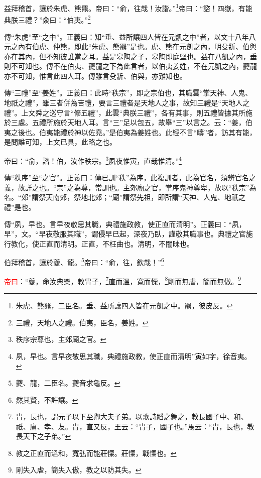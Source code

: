 益拜稽首，讓於朱虎、熊羆。帝曰：“俞，往哉！汝諧。”\footnote{朱虎、熊羆，二臣名。垂、益所讓四人皆在元凱之中。羆，彼皮反。}帝曰：“諮！四嶽，有能典朕三禮？”僉曰：“伯夷。”\footnote{三禮，天地人之禮。伯夷，臣名，姜姓。}

{\noindent\zhuan{}\fzbyks 傳“朱虎”至“之中”。正義曰：知“垂、益所讓四人皆在元凱之中”者，以文十八年八元之內有伯虎、仲熊，即此“朱虎、熊羆”是也。虎、熊在元凱之內，明殳斨、伯與亦在其內，但不知彼誰當之耳。益是皋陶之子，皋陶即庭堅也。益在八凱之內，垂則不可知也。傳不在伯夷、夔龍之下為此言者，以伯夷姜姓，不在元凱之內，夔龍亦不可知，惟言此四人耳。傳雖言殳斨、伯與，亦難知也。 \par}

{\noindent\zhuan{}\fzbyks 傳“三禮”至“姜姓”。正義曰：此時“秩宗”，即之宗伯也，其職雲“掌天神、人鬼、地祇之禮”，雖三者併為吉禮，要言三禮者是天地人之事，故知三禮是“天地人之禮”。上文舜之巡守言“修五禮”，此雲“典朕三禮”，各有其事，則五禮皆據其所施於三處。五禮所施於天地人耳。言“三”足以包五，故舉“三”以言之。云：“姜，伯夷之後也。伯夷能禮於神以佐堯。”是伯夷為姜姓也。此經不言“疇”者，訪其有能，是問誰可知，上文已具，此略之也。 \par}

帝曰：“俞，諮！伯，汝作秩宗。\footnote{秩序宗尊也，主郊廟之官。}夙夜惟寅，直哉惟清。”\footnote{夙，早也。言早夜敬思其職，典禮施政教，使正直而清明”寅如字，徐音夷。}

{\noindent\zhuan{}\fzbyks 傳“秩序”至“之官”。正義曰：傳已訓“秩”為序，此複訓者，此為官名，須辨官名之義，故詳之也。“宗”之為尊，常訓也。主郊廟之官，掌序鬼神尊卑，故以“秩宗”為名。“郊”謂祭天南郊，祭地北郊；“廟”謂祭先祖，即所謂“天神、人鬼、地祇之禮”是也。 \par}

{\noindent\zhuan{}\fzbyks 傳“夙，早也。言早夜敬思其職，典禮施政教，使正直而清明”。正義曰：“夙，早”，文。“早夜敬服其職”，謂侵早已起，深夜乃臥，謹敬其職事也。典禮之官施行教化，使正直而清明。正直，不枉曲也。清明，不闇昧也。 \par}

伯拜稽首，讓於夔、龍。\footnote{夔、龍，二臣名。夔音求龜反。}帝曰：“俞，往，欽哉！”\footnote{然其賢，不許讓。}

\textcolor{red}{帝曰}：“夔，命汝典樂，教胄子，\footnote{胄，長也，謂元子以下至卿大夫子弟。以歌詩蹈之舞之，教長國子中、和、祇、庸、孝、友。胄，直又反，王云：“胄子，國子也。”馬云：“胄，長也，教長天下之子弟。”}直而溫，寬而慄，\footnote{教之正直而溫和，寬弘而能莊慄。莊慄，戰慄也。}剛而無虐，簡而無傲。\footnote{剛失入虐，簡失入傲，教之以防其失。}

